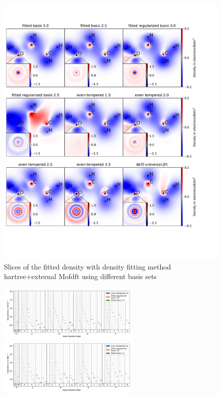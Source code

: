  \begin{figure}
   \centering
   \includegraphics[width=1\textwidth]{chapters/results/results_images/basis_set_slices}
     \caption{Slices of the fitted density with density fitting method hartree+external Mofdft using different basis sets}
 \end{figure}



\begin{figure}
   \centering
   \includegraphics[width=0.6\textwidth]{chapters/results/results_images/basis_functions_with_size2.5}
   \includegraphics[width=0.6\textwidth]{chapters/results/results_images/basis_functions_with_size3.0}
    \caption{}
\end{figure}
 







